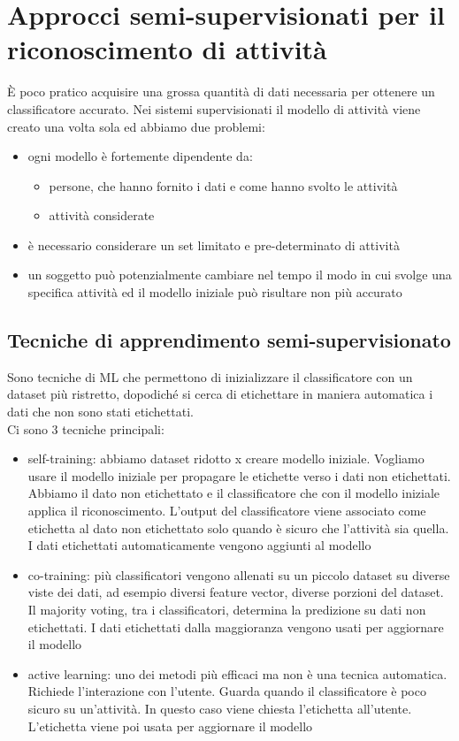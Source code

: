 \section{Approcci semi-supervisionati per il riconoscimento di attività}
È poco pratico acquisire una grossa quantità di dati necessaria per ottenere un classificatore accurato.
Nei sistemi supervisionati il modello di attività viene creato una volta sola ed abbiamo due problemi:
\begin{itemize}
    \item ogni modello è fortemente dipendente da:
    \begin{itemize}
        \item persone, che hanno fornito i dati e come hanno svolto le attività
        \item attività considerate
    \end{itemize} 
    \item è necessario considerare un set limitato e pre-determinato di attività
    \item un soggetto può potenzialmente cambiare nel tempo il modo in cui svolge una specifica attività ed il modello iniziale può risultare non più accurato
\end{itemize} 

\subsection{Tecniche di apprendimento semi-supervisionato}
Sono tecniche di ML che permettono di inizializzare il classificatore con un dataset più ristretto, dopodiché si cerca di etichettare in maniera automatica i dati che non sono stati etichettati.
\\ Ci sono 3 tecniche principali:
\begin{itemize}
    \item self-training: abbiamo dataset ridotto x creare modello iniziale. Vogliamo usare il modello iniziale per propagare le etichette verso i dati non etichettati. 
    Abbiamo il dato non etichettato e il classificatore che con il modello iniziale applica il riconoscimento. L'output del classificatore viene associato come etichetta al dato non etichettato solo quando è sicuro che l'attività sia quella.
    I dati etichettati automaticamente vengono aggiunti al modello
    \item co-training: più classificatori vengono allenati su un piccolo dataset su diverse viste dei dati, ad esempio diversi feature vector, diverse porzioni del dataset. Il majority voting, tra i classificatori, determina la predizione su dati non etichettati. I dati etichettati dalla maggioranza vengono usati per aggiornare il modello
    \item active learning: uno dei metodi più efficaci ma non è una tecnica automatica. Richiede l'interazione con l'utente. Guarda quando il classificatore è poco sicuro su un'attività. In questo caso viene chiesta l'etichetta all'utente. L'etichetta viene poi usata per aggiornare il modello
\end{itemize}

